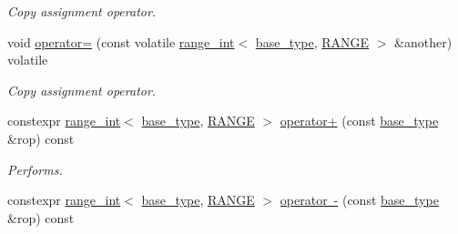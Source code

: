 \begin{DoxyCompactItemize}
\begin{DoxyCompactList}\small\item\em Copy assignment operator. \end{DoxyCompactList}\item 
\mbox{\label{classfsl_1_1ver__1__0_1_1lg_1_1range__int_a835e5b680ec7e1baf1883a7b9f9cbf4c}} 
void \mbox{\hyperlink{classfsl_1_1ver__1__0_1_1lg_1_1range__int_a835e5b680ec7e1baf1883a7b9f9cbf4c}{operator=}} (const volatile \mbox{\hyperlink{classfsl_1_1ver__1__0_1_1lg_1_1range__int}{range\+\_\+int}}$<$ \mbox{\hyperlink{classfsl_1_1ver__1__0_1_1lg_1_1range__int_aa6c763f6d72d18c8b9129c0c06628cd3}{base\+\_\+type}}, \mbox{\hyperlink{classfsl_1_1ver__1__0_1_1lg_1_1range__int_ae1914aaa2b3bdfc26a9dfd71c73efffd}{R\+A\+N\+GE}} $>$ \&another) volatile
\begin{DoxyCompactList}\small\item\em Copy assignment operator. \end{DoxyCompactList}\item 
\mbox{\label{classfsl_1_1ver__1__0_1_1lg_1_1range__int_a6ca845f4b8e8805cba8037d1fd9c4200}} 
constexpr \mbox{\hyperlink{classfsl_1_1ver__1__0_1_1lg_1_1range__int}{range\+\_\+int}}$<$ \mbox{\hyperlink{classfsl_1_1ver__1__0_1_1lg_1_1range__int_aa6c763f6d72d18c8b9129c0c06628cd3}{base\+\_\+type}}, \mbox{\hyperlink{classfsl_1_1ver__1__0_1_1lg_1_1range__int_ae1914aaa2b3bdfc26a9dfd71c73efffd}{R\+A\+N\+GE}} $>$ \mbox{\hyperlink{classfsl_1_1ver__1__0_1_1lg_1_1range__int_a6ca845f4b8e8805cba8037d1fd9c4200}{operator+}} (const \mbox{\hyperlink{classfsl_1_1ver__1__0_1_1lg_1_1range__int_aa6c763f6d72d18c8b9129c0c06628cd3}{base\+\_\+type}} \&rop) const
\begin{DoxyCompactList}\small\item\em Performs. \end{DoxyCompactList}\item 
\mbox{\label{classfsl_1_1ver__1__0_1_1lg_1_1range__int_af5abbdae585d0cfe95f0470be85d5a32}} 
constexpr \mbox{\hyperlink{classfsl_1_1ver__1__0_1_1lg_1_1range__int}{range\+\_\+int}}$<$ \mbox{\hyperlink{classfsl_1_1ver__1__0_1_1lg_1_1range__int_aa6c763f6d72d18c8b9129c0c06628cd3}{base\+\_\+type}}, \mbox{\hyperlink{classfsl_1_1ver__1__0_1_1lg_1_1range__int_ae1914aaa2b3bdfc26a9dfd71c73efffd}{R\+A\+N\+GE}} $>$ \mbox{\hyperlink{classfsl_1_1ver__1__0_1_1lg_1_1range__int_af5abbdae585d0cfe95f0470be85d5a32}{operator -\/}} (const \mbox{\hyperlink{classfsl_1_1ver__1__0_1_1lg_1_1range__int_aa6c763f6d72d18c8b9129c0c06628cd3}{base\+\_\+type}} \&rop) const

\end{DoxyCompactItemize}
